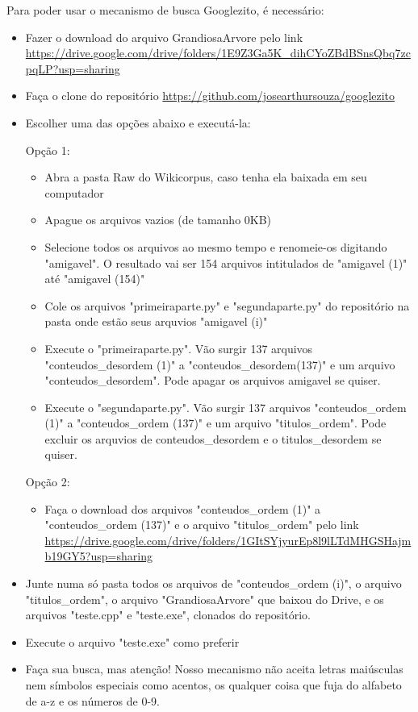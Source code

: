 \documentclass{article}
\begin{document}
Para poder usar o mecanismo de busca Googlezito, é necessário:
\begin{itemize}
    \item Fazer o download do arquivo GrandiosaArvore pelo link \url{https://drive.google.com/drive/folders/1E9Z3Ga5K_dihCYoZBdBSnsQbq7zcpqLP?usp=sharing}
    \item Faça o clone do repositório \url{https://github.com/josearthursouza/googlezito}
    \item Escolher uma das opções abaixo e executá-la:
    
    Opção 1:
    \begin{itemize}
        \item Abra a pasta Raw do Wikicorpus, caso tenha ela baixada em seu computador
        \item Apague os arquivos vazios (de tamanho 0KB)
        \item Selecione todos os arquivos ao mesmo tempo e renomeie-os digitando "amigavel". O resultado vai ser 154 arquivos intitulados de "amigavel (1)" até "amigavel (154)"
        \item Cole os arquivos "primeiraparte.py" e "segundaparte.py" do repositório na pasta onde estão seus arquvios "amigavel (i)"
        \item Execute o "primeiraparte.py". Vão surgir 137 arquivos "conteudos_desordem (1)" a "conteudos_desordem(137)" e um arquivo "conteudos_desordem". Pode apagar os arquivos amigavel se quiser.
        \item Execute o "segundaparte.py". Vão surgir 137 arquivos "conteudos_ordem (1)" a "conteudos_ordem (137)" e um arquivo "titulos_ordem". Pode excluir os arquvios de conteudos_desordem e o titulos_desordem se quiser.
    \end{itemize}
    
    Opção 2:
    \begin{itemize}
        \item Faça o download dos arquivos "conteudos_ordem (1)" a "conteudos_ordem (137)" e o arquivo "titulos_ordem" pelo link \url{https://drive.google.com/drive/folders/1GItSYjyurEp8l9lLTdMHGSHajmb19GY5?usp=sharing}
    \end{itemize}
    
    \item Junte numa só pasta todos os arquivos de "conteudos_ordem (i)", o arquivo "titulos_ordem", o arquivo "GrandiosaArvore" que baixou do Drive, e os arquivos "teste.cpp" e "teste.exe", clonados do repositório.
    
    \item Execute o arquivo "teste.exe" como preferir
    
    \item Faça sua busca, mas atenção! Nosso mecanismo não aceita letras maiúsculas nem símbolos especiais como acentos, os qualquer coisa que fuja do alfabeto de a-z e os números de 0-9.
    
\end{itemize}
\end{document}

